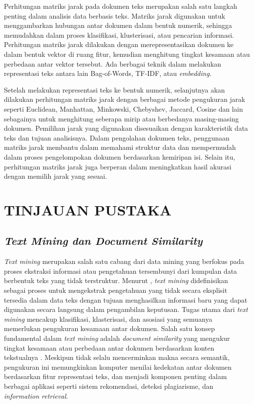 \documentclass[a4paper,12pt]{report}
\numberwithin{equation}{chapter}
\begin{document}
Perhitungan matriks jarak pada dokumen teks merupakan salah satu langkah penting dalam analisis data berbasis teks. Matriks jarak digunakan untuk menggambarkan hubungan antar dokumen dalam bentuk numerik, sehingga memudahkan dalam proses klasifikasi, klusterisasi, atau pencarian informasi. Perhitungan matriks jarak dilakukan dengan merepresentasikan dokumen ke dalam bentuk vektor di ruang fitur, kemudian menghitung tingkat kesamaan atau perbedaan antar vektor tersebut. Ada berbagai teknik dalam melakukan representasi teks antara lain Bag-of-Words, TF-IDF, atau \textit{embedding}. 

Setelah melakukan representasi teks ke bentuk numerik, selanjutnya akan dilakukan perhitungan matriks jarak dengan berbagai metode pengukuran jarak seperti Euclidean, Manhattan, Minkowski, Chebyshev, Jaccard, Cosine dan lain sebagainya untuk menghitung seberapa mirip atau berbedanya masing-masing dokumen. Pemilihan jarak yang digunakan disesuaikan dengan karakteristik data teks dan tujuan analisisnya. Dalam pengolahan dokumen teks, penggunaan matriks jarak membantu dalam memahami struktur data dan mempermudah dalam proses pengelompokan dokumen berdasarkan kemiripan isi. Selain itu, perhitungan matriks jarak juga berperan dalam meningkatkan hasil akurasi dengan memilih jarak yang sesuai.
      

\chapter{TINJAUAN PUSTAKA}
\label{chap:metode}

\section{ \textit{Text Mining dan Document Similarity}}
\textit{Text mining} merupakan salah satu cabang dari data mining yang berfokus pada proses ekstraksi informasi atau pengetahuan tersembunyi dari kumpulan data berbentuk teks yang tidak terstruktur. Menurut \cite{jo2018text}, \textit{text mining} didefinisikan sebagai proses untuk mengekstrak pengetahuan yang tidak secara eksplisit tersedia dalam data teks dengan tujuan menghasilkan informasi baru yang dapat digunakan secara langsung dalam pengambilan keputusan. Tugas utama dari \textit{text mining} mencakup klasifikasi, klasterisasi, dan asosiasi yang semuanya memerlukan pengukuran kesamaan antar dokumen. Salah satu konsep fundamental dalam \textit{text mining} adalah \textit{document similarity} yang mengukur tingkat kesamaan atau perbedaan antar dokumen berdasarkan konten tekstualnya \citep{CharuC.Aggarwal2018MachineLearningforText}. Meskipun tidak selalu mencerminkan makna secara semantik, pengukuran ini memungkinkan komputer menilai kedekatan antar dokumen berdasarkan fitur representasi teks, dan menjadi komponen penting dalam berbagai aplikasi seperti sistem rekomendasi, deteksi plagiarisme, dan  \textit{information retrieval}. 
\end{document}
